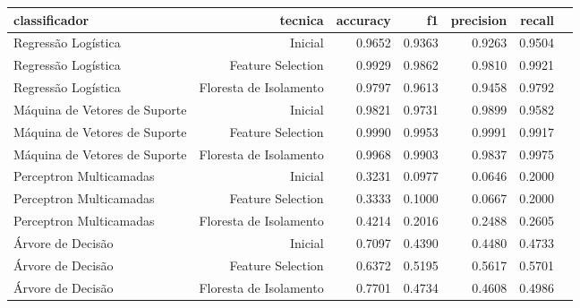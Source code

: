 \begin{tabular}{|l|r|r|r|r|r|r|}
\hline
                 classificador &                 tecnica &  accuracy &      f1 &  precision &  recall \\
\hline
           Regressão Logística &                 Inicial &    0.9652 &  0.9363 &     0.9263 &  0.9504 \\
           Regressão Logística &       Feature Selection &    0.9929 &  0.9862 &     0.9810 &  0.9921 \\
           Regressão Logística &  Floresta de Isolamento &    0.9797 &  0.9613 &     0.9458 &  0.9792 \\
 Máquina de Vetores de Suporte &                 Inicial &    0.9821 &  0.9731 &     0.9899 &  0.9582 \\
 Máquina de Vetores de Suporte &       Feature Selection &    0.9990 &  0.9953 &     0.9991 &  0.9917 \\
 Máquina de Vetores de Suporte &  Floresta de Isolamento &    0.9968 &  0.9903 &     0.9837 &  0.9975 \\
       Perceptron Multicamadas &                 Inicial &    0.3231 &  0.0977 &     0.0646 &  0.2000 \\
       Perceptron Multicamadas &       Feature Selection &    0.3333 &  0.1000 &     0.0667 &  0.2000 \\
       Perceptron Multicamadas &  Floresta de Isolamento &    0.4214 &  0.2016 &     0.2488 &  0.2605 \\
             Árvore de Decisão &                 Inicial &    0.7097 &  0.4390 &     0.4480 &  0.4733 \\
             Árvore de Decisão &       Feature Selection &    0.6372 &  0.5195 &     0.5617 &  0.5701 \\
             Árvore de Decisão &  Floresta de Isolamento &    0.7701 &  0.4734 &     0.4608 &  0.4986 \\
\hline
\end{tabular}
